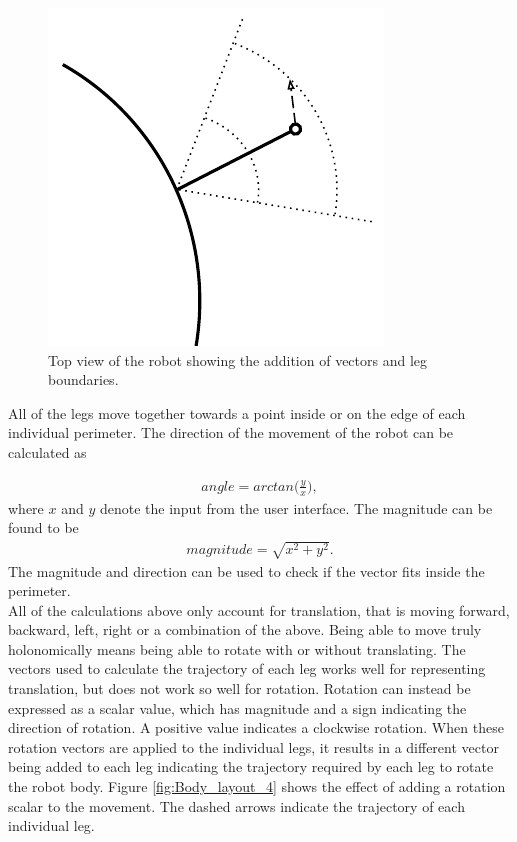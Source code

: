 \FloatBarrier
\begin{figure}[h]
\centering
\includegraphics[scale = 1]{pics/Body_Layout_3.pdf}
\caption{Top view of the robot showing the addition of vectors and leg boundaries.}
\label{fig:Body_layout_3}
\end{figure}
\FloatBarrier

All of the legs move together towards a point inside or on the edge of each individual perimeter. The direction of the movement of the robot can be calculated as

\begin{align}
angle = arctan \Bigg(\frac{y}{x}\Bigg),
\end{align}
where $x$ and $y$ denote the input from the user interface. The magnitude can be found to be
\begin{align}
magnitude = \sqrt{x^2+y^2}.
\end{align}
The magnitude and direction can be used to check if the vector fits inside the perimeter.\\

All of the calculations above only account for translation, that is moving forward, backward, left, right or a combination of the above. Being able to move truly holonomically means being able to rotate with or without translating. The vectors used to calculate the trajectory of each leg works well for representing translation, but does not work so well for rotation. Rotation can instead be expressed as a scalar value, which has magnitude and a sign indicating the direction of rotation. A positive value indicates a clockwise rotation. When these rotation vectors are applied to the individual legs, it results in a different vector being added to each leg indicating the trajectory required by each leg to rotate the robot body. Figure \ref{fig:Body_layout_4} shows the effect of adding a rotation scalar to the movement. The dashed arrows indicate the trajectory of each individual leg.

